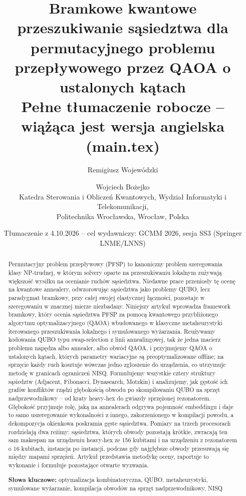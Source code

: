 \documentclass[11pt,a4paper]{article}
\title{Bramkowe kwantowe przeszukiwanie sąsiedztwa dla permutacyjnego
  problemu przepływowego przez QAOA o ustalonych kątach\\[2pt]
  \large Pełne tłumaczenie robocze -- wiążąca jest wersja angielska (main.tex)}
\author{Remigiusz Wojewódzki \and Wojciech Bożejko\\
  \small Katedra Sterowania i Obliczeń Kwantowych, Wydział Informatyki
  i Telekomunikacji,\\ \small Politechnika Wrocławska, Wrocław, Polska}
\date{Tłumaczenie z 4.10.2026 -- cel wydawniczy: GCMM 2026, sesja SS3
  (Springer LNME/LNNS)}
\newcommand{\keywords}[1]{\par\medskip\noindent\textbf{Słowa kluczowe:} #1}
\begin{document}
\maketitle

\begin{abstract}
\noindent
Permutacyjny problem przepływowy (PFSP) to kanoniczny problem szeregowania
klasy NP-trudnej, w którym solvery oparte na przeszukiwaniu lokalnym zużywają
większość wysiłku na ocenianie ruchów sąsiedztwa. Niedawne prace przeniosły tę
ocenę na kwantowe annealery, odwzorowując sąsiedztwa jako problemy QUBO, lecz
paradygmat bramkowy, przy całej swojej elastycznej łączności, pozostaje
w szeregowaniu w znacznej mierze niezbadany. Niniejszy artykuł wprowadza
framework bramkowy, który ocenia sąsiedztwa PFSP za pomocą kwantowego
przybliżonego algorytmu optymalizacyjnego (QAOA) wbudowanego w klasyczne
metaheurystyki iterowanego przeszukiwania lokalnego i symulowanego wyżarzania.
Reużywamy kodowania QUBO typu swap-selection z linii annealingowej, tak że
jedna macierz problemu napędza albo annealer, albo obwód QAOA, i przyjmujemy
QAOA o ustalonych kątach, których parametry wariacyjne są preoptymalizowane
offline; na sprzęcie każdy ruch kosztuje wówczas jedno zgłoszenie do
urządzenia, co utrzymuje metodę w granicach ograniczeń NISQ. Formułujemy
wszystkie cztery struktury sąsiedztw (Adjacent, Fibonacci, Dynasearch,
Motzkin) i analizujemy, jak gęstość ich grafów konfliktów rządzi
głębokością obwodu po skompilowaniu
QUBO na sprzęt nadprzewodnikowy -- od kraty heavy-hex do gwiazdy sprzężonej
rezonatorem. Głębokość przyjmuje rolę, jaką na annealerach odgrywa pojemność
embeddingu i daje to samo uszeregowanie wykonalności z innego, zakorzenionego
w kompilacji powodu, a dekompozycja okienkowa poskramia gęste sąsiedztwa.
Pomiary na trzech procesorach rozdzielają dwa reżimy: sąsiedztwa, których
obwody pozostają krótkie, zwracają ten sam makespan na urządzeniu heavy-hex
ze 156 kubitami i na urządzeniu z rezonatorem o 16 kubitach, instancja po
instancji, podczas gdy najgłębsze obwody przesuwają się między mapami
sprzężeń. Artykuł przedstawia metodykę oceny, raportuje to wykonanie
i formułuje pozostające otwarte wyzwania.
\keywords{optymalizacja kombinatoryczna, QUBO, metaheurystyki, symulowane
  wyżarzanie, kompilacja obwodów na sprzęt nadprzewodnikowy, NISQ}
\end{abstract}

\end{document}

